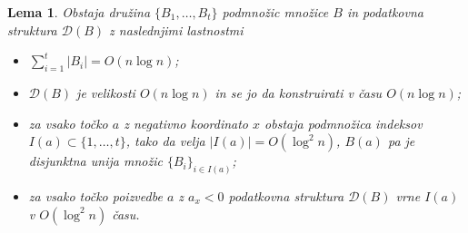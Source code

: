 \documentclass[a4paper, 12pt]{book}
\newcommand{\D}{\ensuremath{\mathcal{D}}}
\newtheorem{lema}[izrek]{Lema}
\begin{document}
\begin{lema}
	Obstaja družina $\{ B_1,\dots, B_t\}$ podmnožic množice $B$ in 			podatkovna struktura $\D (B)$ z naslednjimi lastnostmi
	\begin{itemize}
		\item $\sum_{i=1}^t |B_i| = O(n\log n)$;
		\item $\D (B)$ je velikosti $O(n\log n)$ in se jo da 					konstruirati v času $O(n\log n)$;
		\item za vsako točko $a$ z negativno koordinato $x$ obstaja 			podmnožica indeksov $I(a)\subset \{ 1,\dots,t\}$, tako da velja 		$|I(a)|=O(\log^2 n)$, $B(a)$ pa je disjunktna unija množic $\{ 			B_i \}_{i\in I(a)}$;
		\item za vsako točko poizvedbe $a$ z $a_x<0$ podatkovna 				struktura $\D (B)$ vrne $I(a)$ v $O(\log^2 n)$ času.
	\end{itemize}
\end{lema}
\end{document}
